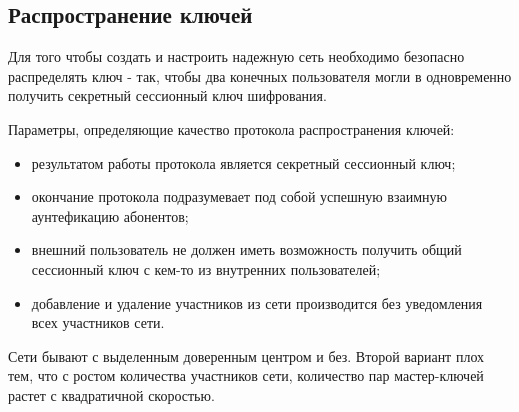 \documentclass[a4paper]{article}
\begin{document}
\subsection{Распространение ключей}
Для того чтобы создать и настроить надежную сеть необходимо безопасно распределять ключ - так, чтобы два конечных пользователя могли в одновременно получить секретный сессионный ключ шифрования. 
\par
Параметры, определяющие качество протокола распространения ключей:
\begin{itemize}
    \item результатом работы протокола является секретный сессионный ключ;
    \item окончание протокола подразумевает под собой успешную взаимную аунтефикацию абонентов;
    \item внешний пользователь не должен иметь возможность получить общий сессионный ключ с кем-то из внутренних пользователей;
    \item добавление и удаление участников из сети производится без уведомления всех участников сети.
\end{itemize}
Сети бывают с выделенным доверенным центром и без. Второй вариант плох тем, что с ростом количества участников сети, количество пар мастер-ключей растет с квадратичной скоростью.
\end{document}
